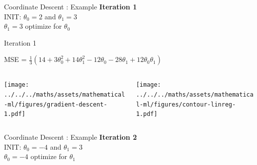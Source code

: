 \documentclass{beamer}
\begin{document}
\begin{frame}{Coordinate Descent : Example}
\textbf{Iteration 1}\\
\vspace{0.5cm}
INIT: $\theta_{0} = 2$ and  $\theta_{1}  = 3$\\

\vspace{0.5cm}
$\theta_1 = 3$ optimize for $\theta_{0}$\\ 


\end{frame}


\begin{frame}{Iteration 1}

MSE = $\frac{1}{3}(14+3\theta_{0}^{2}+14\theta_{1}^{2}-12\theta_{0}-28\theta_{1}+12\theta_{0}\theta_{1})$\\

\begin{columns}
\begin{column}{0.6\textwidth}
\begin{adjustbox}{max totalsize={\textwidth},center}
\texttt{[image: ../../../maths/assets/mathematical-ml/figures/gradient-descent-1.pdf]}
\end{adjustbox}

\end{column}
\begin{column}{0.5\textwidth}
\begin{adjustbox}{max totalsize={\textwidth},center}
\texttt{[image: ../../../maths/assets/mathematical-ml/figures/contour-linreg-1.pdf]}
\end{adjustbox}
\end{column}
\end{columns}


\end{frame}

\begin{frame}{Coordinate Descent : Example}
\textbf{Iteration 2}\\
\vspace{0.5cm}
INIT: $\theta_{0} = -4$ and  $\theta_{1}  = 3$\\

\vspace{0.5cm}
$\theta_0 = -4$ optimize for $\theta_{1}$\\ 


\end{frame}
\end{document}
